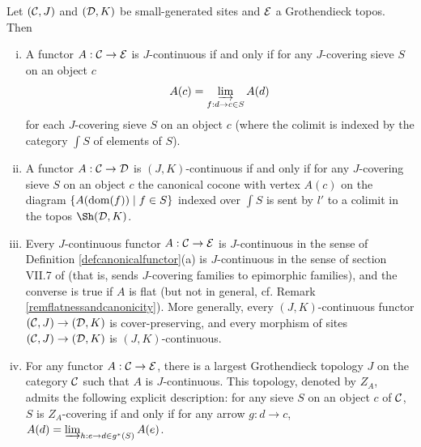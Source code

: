 \documentclass[a4paper,12pt]{article}
\begin{document}
\begin{proposition}\label{propcharJcanonical}
	Let $({\cal C}, J)$ and $({\cal D}, K)$ be small-generated sites and $\cal E$ a Grothendieck topos. Then 		
	\begin{enumerate}[(i)]
		\item A functor $A:{\cal C}\to {\cal E}$ is $J$-continuous if and only if for any $J$-covering sieve $S$ on an object $c$
		\[
		A(c)=\varinjlim_{f:d\to c \in S} A(d) 
		\]
		for each $J$-covering sieve $S$ on an object $c$ (where the colimit is indexed by the category $\int S$ of elements of $S$).
		
		\item A functor $A:{\cal C}\to {\cal D}$ is $(J, K)$-continuous if and only if for any $J$-covering sieve $S$ on an object $c$ the canonical cocone with vertex $A(c)$ on the diagram $\{A(\textup{dom}(f)) \mid f\in S\}$ indexed over $\int S$ is sent by $l'$ to a colimit in the topos $\Sh({\cal D}, K)$. 
		
		\item Every $J$-continuous functor $A:{\cal C}\to {\cal E}$ is $J$-continuous in the sense of Definition \ref{defcanonicalfunctor}(a) is $J$-continuous in the sense of section VII.7 of \cite{MM} (that is, sends $J$-covering families to epimorphic families), and the converse is true if $A$ is flat (but not in general, cf. Remark \ref{remflatnessandcanonicity}). More generally, every $(J, K)$-continuous functor $({\cal C}, J)\to ({\cal D}, K)$ is cover-preserving, and every morphism of sites $({\cal C}, J)\to ({\cal D}, K)$ is $(J, K)$-continuous.
		
		\item For any functor $A:{\cal C}\to {\cal E}$, there is a largest Grothendieck topology $J$ on the category $\cal C$ such that $A$ is $J$-continuous. This topology, denoted by $Z_{A}$, admits the following explicit description: for any sieve $S$ on an object $c$ of $\cal C$, $S$ is $Z_{A}$-covering if and only if for any arrow $g:d\to c$, $A(d)=\varinjlim_{h:e\to d \in g^{\ast}(S)} A(e)$. 	
	\end{enumerate}
\end{proposition}
\end{document}
